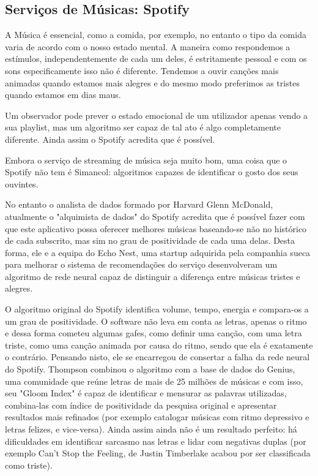 \subsection{ Serviços de Músicas: Spotify}

\par A Música é essencial, como a comida, por exemplo, no entanto o tipo da comida varia de acordo com o nosso estado mental. A maneira como respondemos a estímulos, independentemente de cada um deles, é estritamente pessoal e com os sons especificamente isso não é diferente. Tendemos a ouvir canções mais animadas quando estamos mais alegres e do mesmo modo preferimos as tristes quando estamos em dias maus.
\par Um observador pode prever o estado emocional  de um utilizador apenas vendo a sua playlist, mas um algoritmo ser capaz de tal ato é algo completamente diferente. Ainda assim o Spotify acredita que é possível.
\par Embora o serviço de streaming de música seja muito bom, uma coisa que o Spotify não tem é Simancol: algoritmos capazes de identificar o gosto dos seus ouvintes. 
\par No entanto o analista de dados formado por Harvard Glenn McDonald, atualmente o "alquimista de dados" do Spotify acredita que é possível fazer com que este aplicativo possa oferecer melhores músicas baseando-se não no histórico de cada subscrito, mas sim no grau de positividade de cada uma delas. Desta forma, ele e a equipa do Echo Nest, uma startup adquirida pela companhia sueca para melhorar o sistema de recomendações do serviço desenvolveram um algoritmo de rede neural capaz de distinguir a diferença entre músicas tristes e alegres.
\par O algoritmo original do Spotify identifica volume, tempo, energia e compara-os a um grau de positividade. O software não leva em conta as letras, apenas o ritmo e dessa forma cometeu algumas gafes, como definir uma canção, com uma letra triste, como uma canção animada por causa do ritmo, sendo que ela é exatamente o contrário. Pensando nisto, ele se encarregou de consertar a falha da rede neural do Spotify. Thompson combinou o algoritmo com a base de dados do Genius, uma comunidade que reúne letras de mais de 25 milhões de músicas e com isso, seu "Gloom Index" é capaz de identificar e mensurar as palavras utilizadas, combina-las com índice de positividade da pesquisa original e apresentar resultados mais refinados (por exemplo catalogar músicas com ritmo depressivo e letras felizes, e vice-versa). Ainda assim ainda não é um resultado perfeito: há dificuldades em identificar sarcasmo nas letras e lidar com negativas duplas (por exemplo Can't Stop the Feeling, de Justin Timberlake acabou por ser classificada como triste).
